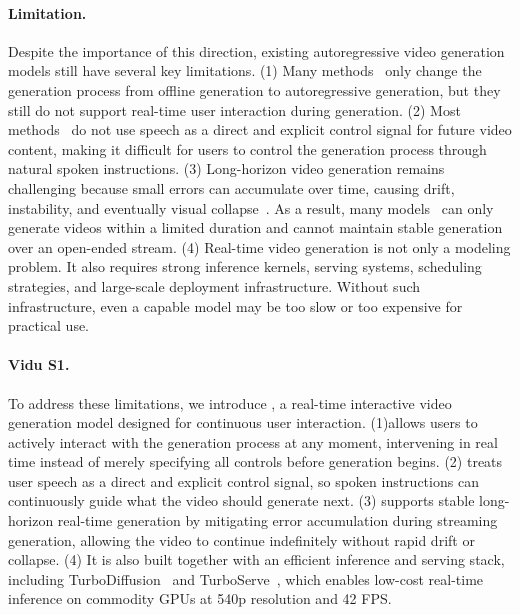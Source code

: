 \paragraph{Limitation.}
Despite the importance of this direction, existing autoregressive video generation models still have several key limitations. (1) Many methods~\citep{DF,kim2024fifo,henschel2025streamingt2v,song2025history} only change the generation process from offline generation to autoregressive generation, but they still do not support real-time user interaction during generation. (2) Most methods~\citep{liu2025rolling,sun2025ar,xie2025progressive,feng2025streamdiffusionv2} do not use speech as a direct and explicit control signal for future video content, making it difficult for users to control the generation process through natural spoken instructions. (3) Long-horizon video generation remains challenging because small errors can accumulate over time, causing drift, instability, and eventually visual collapse~\citep{yin2025slow,huang2026self}. As a result, many models~\citep{huang2026self,liu2025rolling,yin2025slow,zhu2026causal,zhao2026causal,yang2025longlive,teng2025magi,chen2025skyreels,zhang2025packing,gao2025wan} can only generate videos within a limited duration and cannot maintain stable generation over an open-ended stream. (4) Real-time video generation is not only a modeling problem. It also requires strong inference kernels, serving systems, scheduling strategies, and large-scale deployment infrastructure. Without such infrastructure, even a capable model may be too slow or too expensive for practical use.

\vspace{-1pt}
\paragraph{Vidu S1.}
To address these limitations, we introduce \ours, a real-time interactive video generation model designed for continuous user interaction. 
(1)\ours allows users to actively interact with the generation process at any moment, intervening in real time instead of merely specifying all controls before generation begins.
(2) \ours treats user speech as a direct and explicit control signal, so spoken instructions can continuously guide what the video should generate next.
(3) \ours supports stable long-horizon real-time generation by mitigating error accumulation during streaming generation, allowing the video to continue indefinitely without rapid drift or collapse.
(4) It is also built together with an efficient inference and serving stack, including TurboDiffusion~\citep{zhang2025turbodiffusion} and TurboServe~\citep{jiang2026turboserve}, which enables low-cost real-time inference on commodity GPUs at 540p resolution and 42 FPS. 

